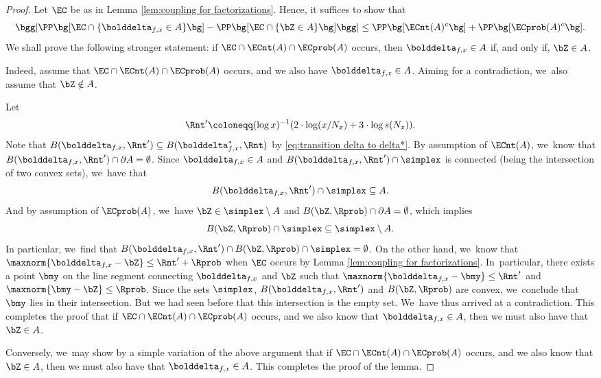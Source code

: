 \begin{proof} Let $\EC$ be as in Lemma \ref{lem:coupling for factorizations}. Hence, it suffices to show that
\begin{equation}
\label{eq:sym diff D and Z on E}
\bgg| \PP\bg[\EC\cap\{\bolddelta_{f, x} \in A\}\bg] - \PP\bg[\EC\cap\{\bZ \in A\}\bg]\bgg| \le \PP\bg[\ECnt(A)^c\bg] + \PP\bg[\ECprob(A)^c\bg].
\end{equation}
We shall prove the following stronger statement: if $\EC\cap \ECnt(A)\cap \ECprob(A)$ occurs, then $\bolddelta_{f, x}\in A$ if, and only if, $\bZ\in A$.

Indeed, assume that $\EC\cap \ECnt(A)\cap \ECprob(A)$ occurs, and we also have $\bolddelta_{f, x}\in A$. Aiming for a contradiction, we~also assume that $\bZ\notin A$.

Let
\[
\Rnt' \coloneqq (\log x)^{-1}(2\cdot \log(x/N_x) + 3\cdot \log s(N_x)).
\]
Note that $B(\bolddelta_{f, x}, \Rnt') \subseteq B(\bolddelta_{f, x}^*, \Rnt)$ by \eqref{eq:transition delta to delta*}. By assumption of $\ECnt(A)$, we~know that \hbox{$B(\bolddelta_{f, x},\Rnt')\cap\partial A=\emptyset$}. Since $\bolddelta_{f, x} \in A$ and $B(\bolddelta_{f, x},\Rnt')\cap \simplex$ is connected (being the intersection of two convex sets), we~have that
\[
B(\bolddelta_{f, x},\Rnt')\cap \simplex \subseteq A.
\]
And by assumption of $\ECprob(A)$, we~have $\bZ \in \simplex \setminus A$ and $B(\bZ,\Rprob)\cap\partial A=\emptyset$, which implies
\[
B(\bZ,\Rprob)\cap \simplex \subseteq \simplex \setminus A.
\]
In particular, we~find that $B(\bolddelta_{f, x}, \Rnt')\cap B(\bZ,\Rprob)\cap \simplex =\emptyset$. On the other hand, we~know that $\maxnorm{\bolddelta_{f, x}-\bZ}\le \Rnt' +\Rprob$ when $\EC$ occurs by Lemma \ref{lem:coupling for factorizations}. In~particular, there exists a point $\bmy$ on the line segment connecting $\bolddelta_{f, x}$ and $\bZ$ such that $\maxnorm{\bolddelta_{f, x}-\bmy}\le \Rnt'$ and $\maxnorm{\bmy-\bZ}\le \Rprob$. Since the sets $\simplex$, $B(\bolddelta_{f, x},\Rnt')$ and $B(\bZ,\Rprob)$ are convex, we~conclude that $\bmy$ lies in their intersection. But we had seen before that this intersection is the empty set. We~have thus arrived at a contradiction. This completes the proof that if $\EC\cap \ECnt(A)\cap \ECprob(A)$ occurs, and we also know that $\bolddelta_{f, x}\in A$, then we must also have that $\bZ\in A$.

Conversely, we~may show by a simple variation of the above argument that if $\EC\cap \ECnt(A)\cap \ECprob(A)$ occurs, and we also know that $\bZ\in A$, then we must also have that $\bolddelta_{f, x}\in A$. This completes the proof of the lemma.
\end{proof}

